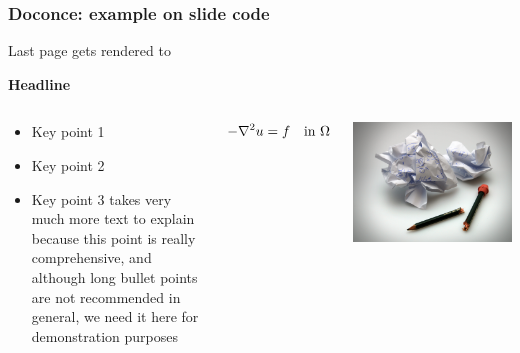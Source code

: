 \documentclass{beamer}
\begin{document}
\begin{frame}
\frametitle{Doconce: example on slide code}

Last page gets rendered to

\noindent\textbf{\Large Headline}

\begin{columns}

\pause
\begin{block}{}
\begin{itemize}
 \item Key point 1

 \item Key point 2

 \item Key point 3 takes very much more text to explain because
   this point is really comprehensive, and although long
   bullet points are not recommended in general, we need
   it here for demonstration purposes
\end{itemize}

\noindent
\end{block}



\pause
\begin{block}{}
\[ -\nabla^2 u = f \quad\hbox{in }\Omega \]
\end{block}



\begin{center}  %
  \centerline{\includegraphics[width=0.9\linewidth]{../doc/slides/fig/broken_pen_and_paper.jpg}}
\end{center}


\end{columns}
\end{frame}
\end{document}
